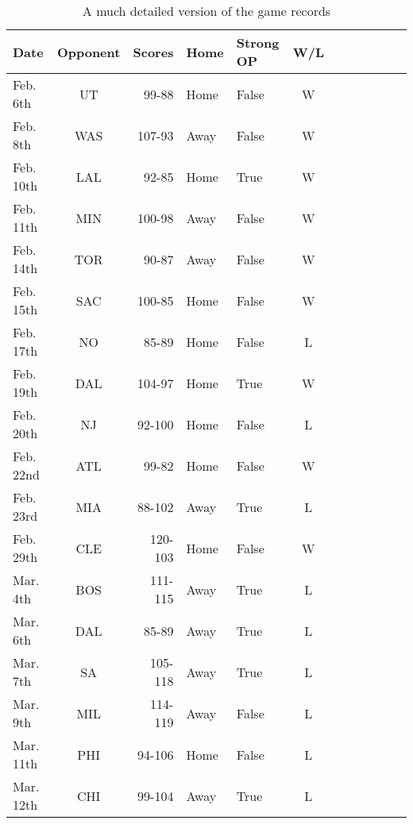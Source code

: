 \documentclass[12pt]{article}
\begin{document}
\begin{table}[ht!]
  \begin{center}
    \begin{tabular}{|l|c|r|l|l|c|l|c|r|l|l|c|}
      \hline
      Date      & Opponent & Scores  & Home & Strong OP & W/L \\ \hline
      Feb. 6th  & UT       & 99-88   & Home & False     & W   \\ \hline
      Feb. 8th  & WAS      & 107-93  & Away & False     & W   \\ \hline
      Feb. 10th & LAL      & 92-85   & Home & True      & W   \\ \hline
      Feb. 11th & MIN      & 100-98  & Away & False     & W   \\ \hline
      Feb. 14th & TOR      & 90-87   & Away & False     & W   \\ \hline
      Feb. 15th & SAC      & 100-85  & Home & False     & W   \\ \hline
      Feb. 17th & NO       & 85-89   & Home & False     & L   \\ \hline
      Feb. 19th & DAL      & 104-97  & Home & True      & W   \\ \hline
      \hline
      Feb. 20th & NJ       & 92-100  & Home & False     & L   \\ \hline
      Feb. 22nd & ATL      & 99-82   & Home & False     & W   \\ \hline
      Feb. 23rd & MIA      & 88-102  & Away & True      & L   \\ \hline
      Feb. 29th & CLE      & 120-103 & Home & False     & W   \\ \hline
      Mar. 4th  & BOS      & 111-115 & Away & True      & L   \\ \hline
      Mar. 6th  & DAL      & 85-89   & Away & True      & L   \\ \hline
      Mar. 7th  & SA       & 105-118 & Away & True      & L   \\ \hline
      Mar. 9th  & MIL      & 114-119 & Away & False     & L   \\ \hline
      Mar. 11th & PHI      & 94-106  & Home & False     & L   \\ \hline
      Mar. 12th & CHI      & 99-104  & Away & True      & L   \\ \hline
    \end{tabular}
  \end{center}
  \caption{A much detailed version of the game records \label{tab:obs}}
\end{table}
\end{document}
